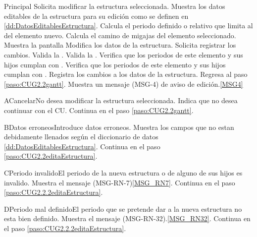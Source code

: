 	\begin{UCtrayectoria}{Principal}
		\UCpaso[\UCactor] Solicita modificar la estructura seleccionada.
		\UCpaso Muestra los datos editables de la estructura para su edición como se definen en \ref{dd:DatosEditablesEstructura}. \label{paso:CUG2.2editaEstructura}
		\UCpaso Calcula el periodo definido o relativo que limita al del elemento nuevo.
		\UCpaso Calcula el camino de migajas del elemento seleccionado.
		\UCpaso Muestra la pantalla 
		\UCpaso [\UCactor] Modifica los datos de la estructura.
		\UCpaso [\UCactor] Solicita registrar los cambios. 
		\UCpaso Valida la  .
		\UCpaso Valida la  . 
		\UCpaso Verifica que los periodos de este elemento y sus hijos cumplan con  .
		\UCpaso Verifica que los periodos de este elemento y sus hijos cumplan con  .
		\UCpaso Registra los cambios a los datos de la estructura.
		\UCpaso Regresa al paso \ref{paso:CUG2.2gantt}.
		\UCpaso Muestra un mensaje (MSG-4) de aviso de edición.\ref{MSG4}
	\end{UCtrayectoria}

	\begin{UCtrayectoriaA}{A}{Cancelar}{No desea modificar la estructura seleccionada.}
		\UCpaso[\UCactor] Indica que no desea continuar con el CU.
		\UCpaso Continua en el paso \ref{paso:CUG2.2gantt}.
	\end{UCtrayectoriaA}

	\begin{UCtrayectoriaA}{B}{Datos erroneos}{Introduce datos erroneos.}
		\UCpaso Muestra los campos que no estan debidamente llenados según el diccionario de datos \ref{dd:DatosEditablesEstructura}.
		\UCpaso Continua en el paso \ref{paso:CUG2.2editaEstructura}.
	\end{UCtrayectoriaA}

	\begin{UCtrayectoriaA}{C}{Periodo invalido}{El periodo de la nueva estructura o de alguno de sus hijos es invalido.}
		\UCpaso Muestra el mensaje (MSG-RN-7)\ref{MSG_RN7}.
		\UCpaso Continua en el paso \ref{paso:CUG2.2.2editaEstructura}.
	\end{UCtrayectoriaA}

	\begin{UCtrayectoriaA}{D}{Periodo mal definido}{El periodo que se pretende dar a la nueva estructura no esta bien definido.}
		\UCpaso Muestra el mensaje (MSG-RN-32).\ref{MSG_RN32}.
		\UCpaso Continua en el paso \ref{paso:CUG2.2.2editaEstructura}.
	\end{UCtrayectoriaA}


